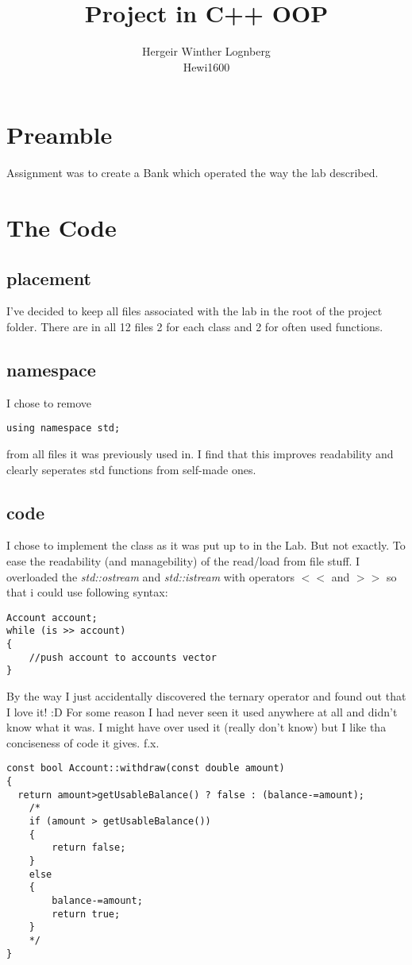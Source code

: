 \documentclass[11pt]{article}
\title{\textbf{Project in C++ OOP}}
\author{Hergeir Winther Lognberg \\
Hewi1600}
\date{}
\begin{document}
\maketitle

\section{Preamble}

Assignment was to create a Bank which operated the way the lab described.

\section{The Code}
\subsection{placement}
I've decided to keep all files associated with the lab in the root of the project folder. There are in all 12 files 2 for each class and 2 for often used functions. 

\subsection{namespace}
I chose to remove
\begin{lstlisting}
using namespace std;
\end{lstlisting}
from all files it was previously used in. I find that this improves readability and clearly seperates std functions from self-made ones.

\subsection{code}
I chose to implement the class as it was put up to in the Lab. But not exactly. To ease the readability (and managebility) of the read/load from file stuff. I overloaded the \emph{std::ostream} and \emph{std::istream} with operators  $<<$ and $>>$ so that i could use following syntax:

\begin{lstlisting}
Account account;
while (is >> account)
{
	//push account to accounts vector
}\end{lstlisting}


By the way I just accidentally discovered the ternary operator and found out that I love it! :D 
For some reason I had never seen it used anywhere at all and didn't know what it was. I might have over used it (really don't know)
but I like tha conciseness of code it gives. f.x.
\begin{lstlisting}
const bool Account::withdraw(const double amount)
{
  return amount>getUsableBalance() ? false : (balance-=amount);
	/*
	if (amount > getUsableBalance())
	{
		return false;
	}
	else
	{
		balance-=amount;
		return true;
	}
	*/
}
\end{lstlisting}
\end{document}
